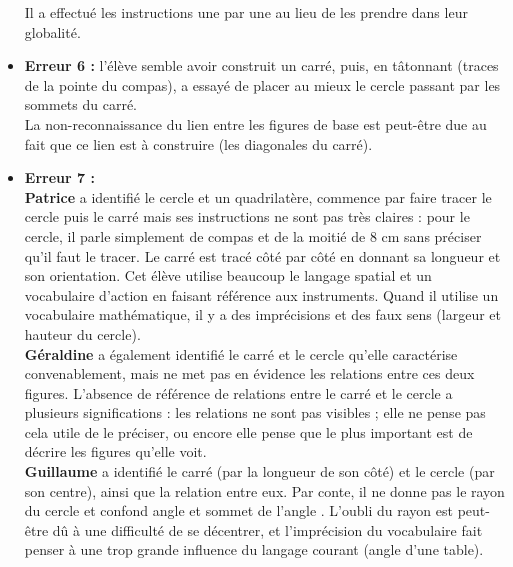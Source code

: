 \begin{corrige}
\begin{itemize}
   Il a effectué les instructions une par une au lieu de les prendre dans leur globalité.
   \item {\bf Erreur 6 :} l'élève semble avoir construit un carré, puis, en tâtonnant (traces de la pointe du compas), a essayé de placer au mieux le cercle passant par les sommets du carré. \\
   La non-reconnaissance du lien entre les figures de base est peut-être due au fait que ce lien est à construire (les diagonales du carré).
   \item {\bf Erreur 7 :} \\
      {\bf Patrice} a identifié le cercle et un quadrilatère, commence par faire tracer le cercle puis le carré mais ses instructions ne sont pas très claires : pour le cercle, il parle simplement de compas et de la moitié de 8 cm sans préciser qu'il faut le tracer. Le carré est tracé côté par côté en donnant sa longueur et son orientation. Cet élève utilise beaucoup le langage spatial et un vocabulaire d'action en faisant référence aux instruments. Quand il utilise un vocabulaire mathématique, il y a des imprécisions et des faux sens (largeur et hauteur du cercle). \\
      {\bf Géraldine} a également identifié le carré et le cercle qu'elle caractérise convenablement, mais ne met pas en évidence les relations entre ces deux figures. L'absence de référence de relations entre le carré et le cercle a plusieurs significations : les relations ne sont pas visibles ; elle ne pense pas cela utile de le préciser, ou encore elle pense que le plus important est de décrire les figures qu'elle voit. \\
      {\bf Guillaume} a identifié le carré (par la longueur de son côté) et le cercle (par son centre), ainsi que la relation entre eux. Par conte, il ne donne pas le rayon du cercle et confond \og angle \fg{} et \og sommet de l'angle \fg{}. L'oubli du rayon est peut-être dû à une difficulté de se décentrer, et l'imprécision du vocabulaire fait penser à une trop grande influence du langage courant (angle d'une table).
\end{itemize}
\end{corrige}

\pagebreak


